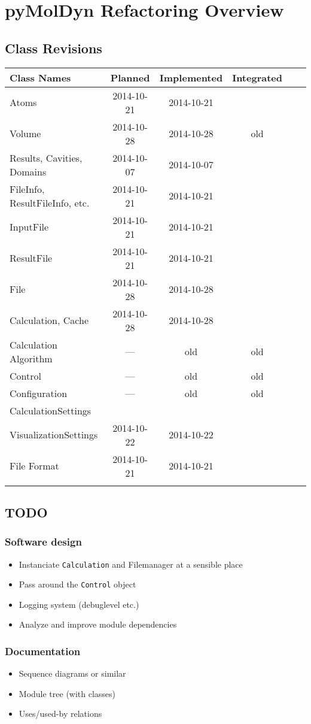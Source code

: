 \documentclass[final, oneside, a4paper, 11pt, pdftex, english]{scrreprt}
\begin{document}
\chapter*{pyMolDyn Refactoring Overview}
\section*{Class Revisions}

\begin{tabular}{|l|c|c|c|c|c|}
    \hline
    \textbf{Class Names} & \textbf{Planned} & \textbf{Implemented} & \textbf{Integrated} \\
    \hline
    Atoms & 2014-10-21 & 2014-10-21 & \\
    \hline
    Volume & 2014-10-28 & 2014-10-28 & old \\
    \hline
    Results, Cavities, Domains & 2014-10-07 & 2014-10-07 & \\
    \hline
    FileInfo, ResultFileInfo, etc. & 2014-10-21 & 2014-10-21 & \\
    \hline
    InputFile & 2014-10-21 & 2014-10-21 & \\
    \hline
    ResultFile & 2014-10-21 & 2014-10-21 & \\
    \hline
    File & 2014-10-28 & 2014-10-28 & \\
    \hline
    Calculation, Cache & 2014-10-28 & 2014-10-28 & \\
    \hline
    Calculation Algorithm & --- & old & old \\
    \hline
    Control & --- & old & old \\
    \hline
    Configuration & --- & old & old \\
    \hline
    CalculationSettings & & & \\
    \hline
    VisualizationSettings & 2014-10-22 & 2014-10-22 & \\
    \hline
    File Format & 2014-10-21 & 2014-10-21 & \\
    \hline
    & & & \\
    \hline
\end{tabular}


\section*{TODO}
\subsection*{Software design}
\begin{itemize}\itemsep0pt
    \item Instanciate \texttt{Calculation} and Filemanager at a sensible place
    \item Pass around the \texttt{Control} object
    \item Logging system (debuglevel etc.)
    \item Analyze and improve module dependencies
\end{itemize}


\subsection*{Documentation}
\begin{itemize}\itemsep0pt
    \item Sequence diagrams or similar
    \item Module tree (with classes)
    \item Uses/used-by relations
\end{itemize}
\end{document}
